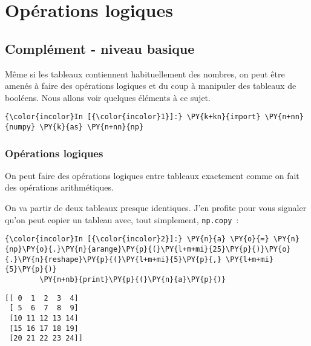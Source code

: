     
    
    
    

    

    \hypertarget{opuxe9rations-logiques}{%
\section{Opérations logiques}\label{opuxe9rations-logiques}}

    \hypertarget{compluxe9ment---niveau-basique}{%
\subsection{Complément - niveau
basique}\label{compluxe9ment---niveau-basique}}

    Même si les tableaux contiennent habituellement des nombres, on peut
être amenés à faire des opérations logiques et du coup à manipuler des
tableaux de booléens. Nous allons voir quelques éléments à ce sujet.

    \begin{Verbatim}[commandchars=\\\{\}]
{\color{incolor}In [{\color{incolor}1}]:} \PY{k+kn}{import} \PY{n+nn}{numpy} \PY{k}{as} \PY{n+nn}{np}
\end{Verbatim}


    \hypertarget{opuxe9rations-logiques}{%
\subsubsection{Opérations logiques}\label{opuxe9rations-logiques}}

    On peut faire des opérations logiques entre tableaux exactement comme on
fait des opérations arithmétiques.

    On va partir de deux tableaux presque identiques. J'en profite pour vous
signaler qu'on peut copier un tableau avec, tout simplement,
\texttt{np.copy}~:

    \begin{Verbatim}[commandchars=\\\{\}]
{\color{incolor}In [{\color{incolor}2}]:} \PY{n}{a} \PY{o}{=} \PY{n}{np}\PY{o}{.}\PY{n}{arange}\PY{p}{(}\PY{l+m+mi}{25}\PY{p}{)}\PY{o}{.}\PY{n}{reshape}\PY{p}{(}\PY{l+m+mi}{5}\PY{p}{,} \PY{l+m+mi}{5}\PY{p}{)}
        \PY{n+nb}{print}\PY{p}{(}\PY{n}{a}\PY{p}{)}
\end{Verbatim}


    \begin{Verbatim}[commandchars=\\\{\}]
[[ 0  1  2  3  4]
 [ 5  6  7  8  9]
 [10 11 12 13 14]
 [15 16 17 18 19]
 [20 21 22 23 24]]

    \end{Verbatim}

